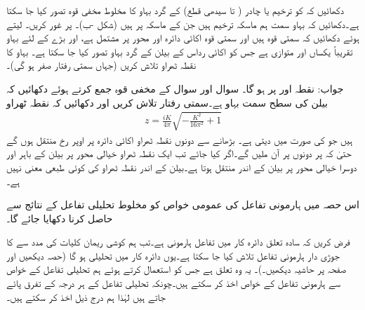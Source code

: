 \quad
دکھائیں کہ  کو ترخیم یا چادر ( تا  سیدھی قطع) کے گرد بہاو کا مخلوط مخفی قوہ تصور کیا جا سکتا ہے۔دکھائیں کہ بہاو سمت ہم ماسکہ ترخیم ہیں جن کے ماسکہ  پر ہیں (شکل -ب)۔
\quad {}\quad
{} پر غور کریں۔  لیتے ہوئے دکھائیں کہ سمتی قوہ  ہیں اور سمتی قوہ  اکائی دائرہ اور  محور پر مشتمل ہے، اور بڑے  کے لئے بہاو تقریباً یکساں اور متوازی ہے جس کو اکائی رداس کے بیلن کے گرد بہاو تصور کیا جا سکتا ہے۔ بہاو کا نقطہ ٹھراو تلاش کریں (جہاں سمتی رفتار صفر ہو گی)۔

جواب:\quad
نقطہ  اور  پر  ہو گا۔
\quad {}\quad
سوال  اور سوال  کے مخفی قوہ جمع کرتے ہوئے دکھائیں کہ بیلن کی سطح  سمت بہاو ہے۔سمتی رفتار تلاش کریں اور دکھائیں کہ نقطہ ٹھراو
\begin{align*}
z=\frac{iK}{4\pi}\sqrt{-\frac{K^2}{16\pi^2}+1}
\end{align*}
ہیں جو  کی صورت میں  دیتی ہے۔ بڑھانے سے دونوں نقطہ ٹھراو اکائی دائرہ پر اوپر رخ منتقل ہوں گے  حتیٰ کہ  پر دونوں  پر آن ملیں گے۔اگر   کیا جائے تب ایک نقطہ ٹھراو خیالی محور پر بیلن کے باہر اور دوسرا خیالی محور پر بیلن کے اندر منتقل ہوتا ہے۔بیلن کے اندر نقطہ ٹھراو کی کوئی طبعی معنی نہیں ہے۔

اس حصہ میں ہارمونی تفاعل کی عمومی خواص کو مخلوط تحلیلی تفاعل کے نتائج سے حاصل کرنا دکھایا جائے گا۔

فرض کریں کہ سادہ تعلق دائرہ کار  میں تفاعل  ہارمونی ہے۔تب ہم کوشی ریمان کلیات کی مدد سے  کا جوڑی دار ہارمونی تفاعل  تلاش کیا جا سکتا ہے۔یوں   دائرہ کار  میں تحلیلی ہو گا (حصہ  دیکھیں اور  صفحہ  پر حاشیہ دیکھیں۔)۔ یہ وہ تعلق ہے جس کو استعمال کرتے ہوئے ہم تحلیلی تفاعل کے خواص سے ہارمونی تفاعل کے خواص اخذ کر سکتے ہیں۔چونکہ تحلیلی تفاعل کے ہر درجہ کے تفرق پائے جاتے ہیں لہٰذا ہم درج ذیل اخذ کر سکتے ہیں۔

